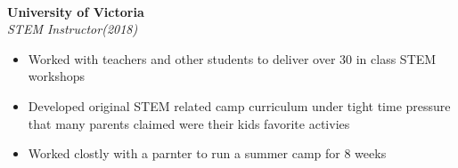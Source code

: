 \documentclass{article}
\newcommand{\grayhline}{
  \noindent\makebox[\linewidth]{\textcolor{gray}{\rule{0.95\textwidth}{1pt}}}\\
}
\newcommand{\minicolumns}[2]{
  \begin{minipage}[t]{0.25\textwidth}
    \begin{flushright}
      #1
    \end{flushright}
  \end{minipage}
  \hfill
  \begin{minipage}[t]{0.7\textwidth}
    #2
  \end{minipage}
}
\newcommand{\resumeSection}[3]{
  \minicolumns{
      \textbf{#1}\\
      \textit{#2}
    }
    {
      \begin{itemize}[leftmargin=*]
          \justifying
          \setlength\itemsep{-0.1em}
          #3
      \end{itemize}
  }
  \vspace{0.5\baselineskip}
}
\begin{document}
\grayhline
\vspace{0.5\baselineskip}
\resumeSection{University of Victoria}{STEM Instructor(2018)}{
  \item Worked with teachers and other students to deliver over 30 in class STEM workshops
  \item Developed original STEM related camp curriculum under tight time pressure
  that many parents claimed were their kids favorite activies
  \item Worked clostly with a parnter to run a summer camp for 8 weeks
}
\end{document}

